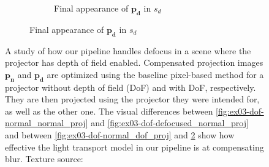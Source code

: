 \begin{figure}[]
\begin{subfigure}{\textwidth}
\begin{subfigure}{0.32\textwidth}
            \caption{Final appearance of \(\bm{p_d}\) in \(s_d\)}
            \vspace*{5mm}
            \label{fig:ex03-dof-defocused_defocused_proj}
        \end{subfigure}
    \end{subfigure}
    \caption{A study of how our pipeline handles defocus in a scene where the projector has depth of field enabled. Compensated projection images \(\bm{p_n}\) and \(\bm{p_d}\) are optimized using the baseline pixel-based method for a projector without depth of field (DoF) and with DoF, respectively. They are then projected using the projector they were intended for, as well as the other one. The visual differences between \ref{fig:ex03-dof-normal_normal_proj} and \ref{fig:ex03-dof-defocused_normal_proj} and between \ref{fig:ex03-dof-normal_dof_proj} and \ref{fig:ex03-dof-defocused_defocused_proj} show how effective the light transport model in our pipeline is at compensating blur. Texture source: \citet{Pixar128}}
    \label{fig:ex03-dof}
\end{figure}

